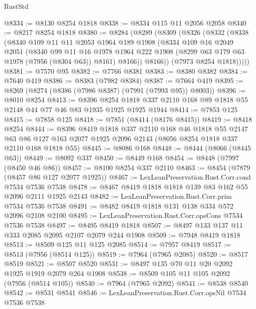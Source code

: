 \begin{lexlean}{RustStd}
\begin{coremodule}
{\begin{coremodule}
{{{{{{{{{{{{{{{{{{{{{{{{{{{{{{{{{{{{{{{{{{{@8334 := @8130 @8254 @1818
@8338 := @8334 @115 @11 @2056 @2058
@8340 := @8217 @8254 @1818
@8380 := @8284
    (@8289
      (@8309
        (@8326
          (@8332
            (@8338
              (@8340
                @109
                @11
                @11
                @2053
                @1964
                @189
                @1908
                (@8334
                  @109
                  @16
                  @2049
                  @2051
                  (@8340
                    @99
                    @11
                    @16
                    @1978
                    @1964
                    @222
                    @1908
                    (@8299 @63 @179 @63 @1978 (@7956 (@8304 @63)) @8161)
                    @8166))
                @8166))
            (@7973 @8254 @1818)))))
@8381 := @7570 @95
@8382 := @7766 @8381
@8383 := @8380 @8382
@8384 := @7640 @419
@8386 := @8383 (@7982 @8384)
@8387 := @7664 @419
@8395 := @8269 (@8274 (@8386 (@7986 @8387) (@7991 (@7993 @95)) @8003))
@8396 := @8010 @8254
@8413 := @8396
    @8254
    @1818
    @337
    @2110
    @168
    @89
    @1818
    @55
    @2148
    @44
    @77
    @46
    @83
    @1935
    @1925
    @1925
    @1944
@8414 := @7853 @125
@8415 := @7858 @125
@8418 := @7851 (@8414 (@8176 @8415))
@8419 := @8418 @8254
@8444 := @8396
    @8419
    @1818
    @337
    @2110
    @168
    @46
    @1818
    @55
    @2147
    @63
    @86
    @127
    @163
    @2077
    @1925
    @2096
    @2143
    (@8056 @8254 @1818 @337 @2110 @168 @1818 @55)
@8445 := @8086 @168
@8448 := @8444 (@8066 (@8445 @63))
@8449 := @8092 @337
@8450 := @8449 @168
@8454 := @8448 (@7997 (@8450 @46 @86))
@8457 := @8100 @8254 @337 @2110
@8463 := @8454 (@7879 (@8457 @86 @127 @2077 @1925))
@8467 := LexLeanPreservation.Rust.Corr.cond @7534 @7536 @7538
@8478 := @8467 @8419 @1818 @1818 @139 @83 @162 @55 @2096 @2111 @1925 @2143
@8482 := LexLeanPreservation.Rust.Corr.prim @7534 @7536 @7538
@8491 := @8482 @8419 @1818 @131 @138 @334 @572 @2096 @2108 @2100
@8495 := LexLeanPreservation.Rust.Corr.opsCons @7534 @7536 @7538
@8497 := @8495 @8419 @1818
@8507 := @8497 @133 @137 @11 @333 @2085 @2095 @2107 @2079 @244 @1908
@8509 := @7948 @8419 @1818
@8513 := @8509 @125 @11 @125 @2085
@8514 := @7957 @8419
@8517 := @8513 (@7956 (@8514 @125))
@8519 := @7964 (@7965 @2085)
@8520 := @8517 @8519
@8521 := @8507 @8520
@8531 := @8497 @135 @70 @11 @20 @2092 @1925 @1919 @2079 @264 @1908
@8538 := @8509 @105 @11 @105 @2092 (@7956 (@8514 @105))
@8540 := @7964 (@7965 @2092)
@8541 := @8538 @8540
@8542 := @8531 @8541
@8546 := LexLeanPreservation.Rust.Corr.opsNil @7534 @7536 @7538
}}}}}}}}}}}}}}}}}}}}}}}}}}}}}}}}}}}}}}}}}}}
\end{coremodule}}
\end{coremodule}
\end{lexlean}
